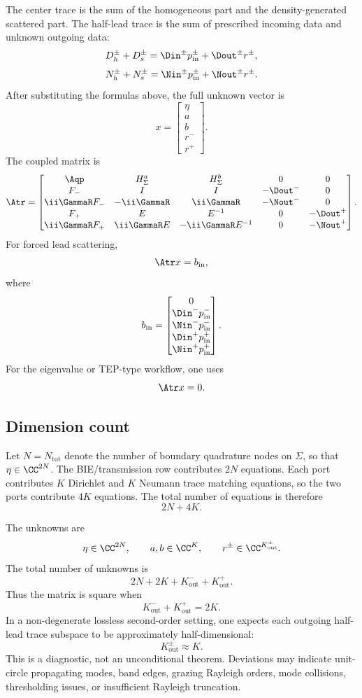 The center trace is the sum of the homogeneous part and the density-generated
scattered part.  The half-lead trace is the sum of prescribed incoming data and
unknown outgoing data:
\[
  D_h^\pm+D_s^\pm
  =
  \Din^\pm p_{\mathrm{in}}^\pm+\Dout^\pm r^\pm,
\]
\[
  N_h^\pm+N_s^\pm
  =
  \Nin^\pm p_{\mathrm{in}}^\pm+\Nout^\pm r^\pm .
\]
After substituting the formulas above, the full unknown vector is
\[
  x=
  \begin{bmatrix}
  \eta\\
  a\\
  b\\
  r^-\\
  r^+
  \end{bmatrix}.
\]
The coupled matrix is
\[
  \Atr
  =
  \begin{bmatrix}
  \Aqp & H_\Sigma^a & H_\Sigma^b & 0 & 0\\
  F_- & I & I & -\Dout^- & 0\\
  \ii\GammaR F_- & -\ii\GammaR & \ii\GammaR & -\Nout^- & 0\\
  F_+ & E & E^{-1} & 0 & -\Dout^+\\
  \ii\GammaR F_+ & \ii\GammaR E & -\ii\GammaR E^{-1} & 0 & -\Nout^+
  \end{bmatrix}.
\]
For forced lead scattering,
\[
  \Atr x=b_{\mathrm{in}},
\]
where
\[
  b_{\mathrm{in}}
  =
  \begin{bmatrix}
  0\\
  \Din^-p_{\mathrm{in}}^-\\
  \Nin^-p_{\mathrm{in}}^-\\
  \Din^+p_{\mathrm{in}}^+\\
  \Nin^+p_{\mathrm{in}}^+
  \end{bmatrix}.
\]
For the eigenvalue or TEP-type workflow, one uses
\[
  \Atr x=0 .
\]

\subsection{Dimension count}

Let \(N=N_{\mathrm{tot}}\) denote the number of boundary quadrature nodes on
\(\Sigma\), so that \(\eta\in\CC^{2N}\).  The BIE/transmission row contributes
\(2N\) equations.  Each port contributes \(K\) Dirichlet and \(K\) Neumann trace
matching equations, so the two ports contribute \(4K\) equations.  The total
number of equations is therefore
\[
  2N+4K .
\]

The unknowns are
\[
  \eta\in\CC^{2N},
  \qquad
  a,b\in\CC^K,
  \qquad
  r^\pm\in\CC^{K_{\mathrm{out}}^\pm}.
\]
The total number of unknowns is
\[
  2N+2K+K_{\mathrm{out}}^-+K_{\mathrm{out}}^+ .
\]
Thus the matrix is square when
\[
  K_{\mathrm{out}}^-+K_{\mathrm{out}}^+=2K .
\]
In a non-degenerate lossless second-order setting, one expects each outgoing
half-lead trace subspace to be approximately half-dimensional:
\[
  K_{\mathrm{out}}^\pm\approx K .
\]
This is a diagnostic, not an unconditional theorem.  Deviations may indicate
unit-circle propagating modes, band edges, grazing Rayleigh orders, mode
collisions, thresholding issues, or insufficient Rayleigh truncation.
